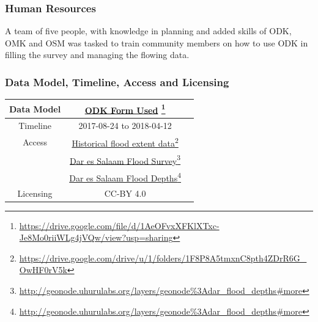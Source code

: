\documentclass[a4paper,12pt,twoside]{article}
\begin{document}
\subsubsection{Human Resources}
A team of five people, with knowledge in planning and added skills of ODK, OMK and OSM was tasked to train community members on how to use ODK in filling the survey and managing the flowing data.

\subsubsection{Data Model, Timeline, Access and Licensing}
\begin{center}
\begin{tabular}{|c|c|c|}  
\hline
Data Model &  \href{https://drive.google.com/file/d/1AeOFvxXFKlXTxc-Je8Mo0riiWLg4jVQw/view?usp=sharing
}{ODK Form Used} \footnote{\url{https://drive.google.com/file/d/1AeOFvxXFKlXTxc-Je8Mo0riiWLg4jVQw/view?usp=sharing}} \\
 \hline
  Timeline  &  2017-08-24 to 2018-04-12 \\
\hline  
 Access  & 
    \href{https://drive.google.com/drive/u/1/folders/1F8P8A5tmxnC8pth4ZDrR6G_OwHF0rV5k}{Historical flood extent data}\footnote{\url{https://drive.google.com/drive/u/1/folders/1F8P8A5tmxnC8pth4ZDrR6G_OwHF0rV5k}}\\
{} & 
    \href{http://geonode.uhurulabs.org/layers/geonode\%3Adar_flood_depths#more}{Dar es Salaam Flood Survey}\footnote{\url{http://geonode.uhurulabs.org/layers/geonode\%3Adar_flood_depths#more}}\\
 {} &    
     \href{http://geonode.uhurulabs.org/layers/geonode\%3Adar_flood_depths#more}{Dar es Salaam Flood Depths}\footnote{\url{http://geonode.uhurulabs.org/layers/geonode\%3Adar_flood_depths#more}} \\
\hline
Licensing   &  CC-BY 4.0 \\
\hline
\end{tabular}
\end{center}
\end{document}
